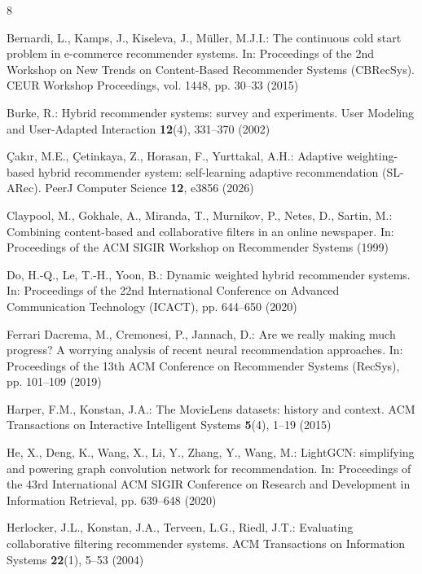 \documentclass[runningheads]{llncs}
\begin{document}
\begin{thebibliography}{8}

Bernardi, L., Kamps, J., Kiseleva, J., M{\"u}ller, M.J.I.: The continuous cold start problem in e-commerce recommender systems. In: Proceedings of the 2nd Workshop on New Trends on Content-Based Recommender Systems (CBRecSys). CEUR Workshop Proceedings, vol. 1448, pp. 30--33 (2015)

Burke, R.: Hybrid recommender systems: survey and experiments. User Modeling and User-Adapted Interaction \textbf{12}(4), 331--370 (2002)

{\c{C}}ak{\i}r, M.E., {\c{C}}etinkaya, Z., Horasan, F., Yurttakal, A.H.: Adaptive weighting-based hybrid recommender system: self-learning adaptive recommendation (SL-ARec). PeerJ Computer Science \textbf{12}, e3856 (2026)

Claypool, M., Gokhale, A., Miranda, T., Murnikov, P., Netes, D., Sartin, M.: Combining content-based and collaborative filters in an online newspaper. In: Proceedings of the ACM SIGIR Workshop on Recommender Systems (1999)

Do, H.-Q., Le, T.-H., Yoon, B.: Dynamic weighted hybrid recommender systems. In: Proceedings of the 22nd International Conference on Advanced Communication Technology (ICACT), pp. 644--650 (2020)

Ferrari Dacrema, M., Cremonesi, P., Jannach, D.: Are we really making much progress? A worrying analysis of recent neural recommendation approaches. In: Proceedings of the 13th ACM Conference on Recommender Systems (RecSys), pp. 101--109 (2019)

Harper, F.M., Konstan, J.A.: The MovieLens datasets: history and context. ACM Transactions on Interactive Intelligent Systems \textbf{5}(4), 1--19 (2015)

He, X., Deng, K., Wang, X., Li, Y., Zhang, Y., Wang, M.: LightGCN: simplifying and powering graph convolution network for recommendation. In: Proceedings of the 43rd International ACM SIGIR Conference on Research and Development in Information Retrieval, pp. 639--648 (2020)

Herlocker, J.L., Konstan, J.A., Terveen, L.G., Riedl, J.T.: Evaluating collaborative filtering recommender systems. ACM Transactions on Information Systems \textbf{22}(1), 5--53 (2004)


\end{thebibliography}
\end{document}
